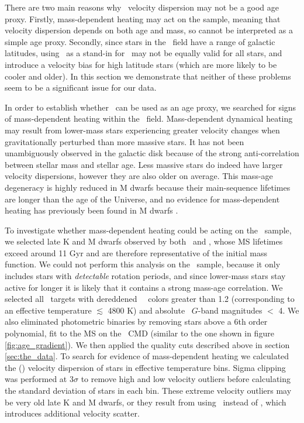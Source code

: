 There are two main reasons why \vb\ velocity dispersion may not be a good age
proxy.
Firstly, mass-dependent heating may act on the sample, meaning that velocity
dispersion depends on both age and mass, so cannot be interpreted as a simple
age proxy.
Secondly, since stars in the \kepler\ field have a range of galactic
latitudes, using \vb\ as a stand-in for \vz\ may not be equally valid for all
stars, and introduce a velocity bias for high latitude stars (which are more
likely to be cooler and older).
In this section we demonstrate that neither of these problems seem to be a
significant issue for our data.

In order to establish whether \sigmavb\ can be used as an age proxy, we
searched for signs of mass-dependent heating within the \kepler\ field.
Mass-dependent dynamical heating may result from lower-mass stars experiencing
greater velocity changes when gravitationally perturbed than more massive
stars.
It has not been unambiguously observed in the galactic disk because of the
strong anti-correlation between stellar mass and stellar age.
Less massive stars do indeed have larger velocity dispersions, however they
are also older on average.
This mass-age degeneracy is highly reduced in M dwarfs because their
main-sequence lifetimes are longer than the age of the Universe, and no
evidence for mass-dependent heating has previously been found in M dwarfs
\citep[\eg][]{faherty2009, newton2016}.

To investigate whether mass-dependent heating could be acting on the \kepler\
sample, we selected late K and M dwarfs observed by both \kepler\ and \gaia,
whose MS lifetimes exceed around 11 Gyr and are therefore representative of
the initial mass function.
We could not perform this analysis on the \mct\ sample, because it only
includes stars with {\it detectable} rotation periods, and since lower-mass
stars stay active for longer it is likely that it contains a strong mass-age
correlation.
We selected all \kepler\ targets with dereddened \gaia\ \gcolor\ colors
greater than 1.2 (corresponding to an effective temperature $\lesssim$
4800 K) and absolute \gaia\ $G$-band magnitudes $<$ 4.
We also eliminated photometric binaries by removing stars above a 6th order
polynomial, fit to the MS on the \gaia\ CMD (similar to the one shown in
figure \ref{fig:age_gradient}).
We then applied the quality cuts described above in section
\ref{sec:the_data}.
To search for evidence of mass-dependent heating we calculated the (\vb)
velocity dispersion of stars in effective temperature bins.
Sigma clipping was performed at 3$\sigma$ to remove high and low velocity
outliers before calculating the standard deviation of stars in each bin.
These extreme velocity outliers may be very old late K and M dwarfs, or they
result from using \vb\ instead of \vz, which introduces additional velocity
scatter.

